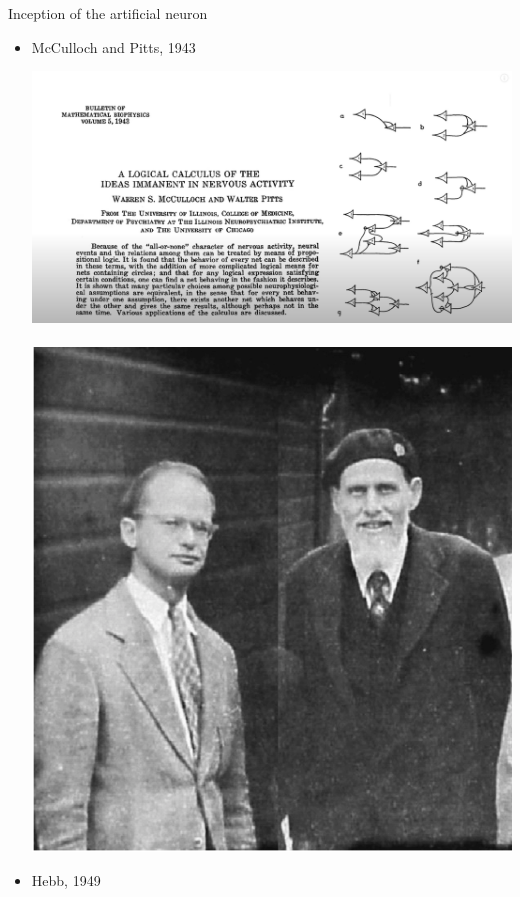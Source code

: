 \documentclass{beamer}
\begin{document}
\begin{frame}{Inception of the artificial neuron}
\begin{itemize}
    \item McCulloch and Pitts, 1943
\begin{center}
\includegraphics[scale=0.15]{pics/McCullochPittsPaper.png}~~~~~~~~
\includegraphics[scale=0.15]{pics/McCullochPitts.png}
\end{center}

\item Hebb, 1949


\end{itemize}
\end{frame}
\end{document}
